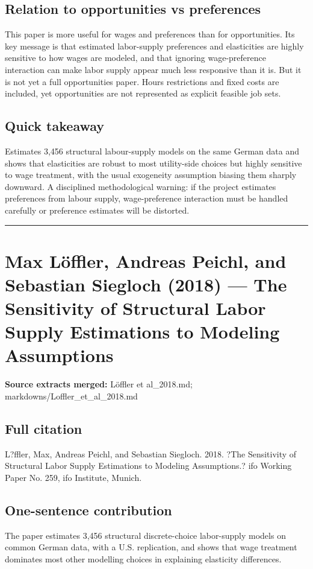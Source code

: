 \documentclass[11pt,a4paper]{article}
\begin{document}
\subsection*{Relation to opportunities vs preferences}
This paper is more useful for wages and preferences than for opportunities. Its key message is that estimated labor-supply preferences and elasticities are highly sensitive to how wages are modeled, and that ignoring wage-preference interaction can make labor supply appear much less responsive than it is. But it is not yet a full opportunities paper. Hours restrictions and fixed costs are included, yet opportunities are not represented as explicit feasible job sets.

\subsection*{Quick takeaway}
Estimates 3,456 structural labour-supply models on the same German data and shows that elasticities are robust to most utility-side choices but highly sensitive to wage treatment, with the usual exogeneity assumption biasing them sharply downward. A disciplined methodological warning: if the project estimates preferences from labour supply, wage-preference interaction must be handled carefully or preference estimates will be distorted.


\medskip\hrule\medskip

\section*{Max Löffler, Andreas Peichl, and Sebastian Siegloch (2018) — The Sensitivity of Structural Labor Supply Estimations to Modeling Assumptions}

\textbf{Source extracts merged:} Löffler et al\_2018.md; markdowns/Loffler\_et\_al\_2018.md

\subsection*{Full citation}
L?ffler, Max, Andreas Peichl, and Sebastian Siegloch. 2018. ?The Sensitivity of Structural Labor Supply Estimations to Modeling Assumptions.? ifo Working Paper No. 259, ifo Institute, Munich.

\subsection*{One-sentence contribution}
The paper estimates 3,456 structural discrete-choice labor-supply models on common German data, with a U.S. replication, and shows that wage treatment dominates most other modelling choices in explaining elasticity differences.
\end{document}
